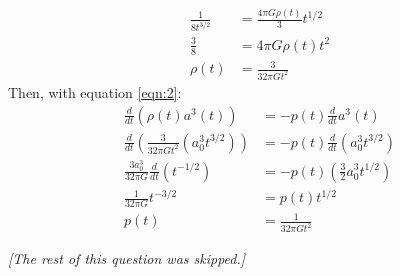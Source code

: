 \documentclass[11pt]{article}
\begin{document}
\begin{enumerate}[label=\textbf{\arabic*.}, start=2]
{\begin{enumerate}[label=\textbf{(\alph*)}]
{\begin{align*}
                        \frac{1}{8t^{3/2}}&=\frac{4\pi G\rho(t)}{3}t^{1/2} \\
                        \frac{3}{8}&=4\pi G\rho(t)t^2 \\
                        \rho(t)&=\frac{3}{32\pi Gt^2}
                    \end{align*}
                    Then, with equation \ref{eqn:2}:
                    \begin{align*}
                        \frac{d}{dt}(\rho(t)a^3(t))&=-p(t)\frac{d}{dt}a^3(t) \\
                        \frac{d}{dt}\left(\frac{3}{32\pi Gt^2}(a_0^3t^{3/2})\right)&=-p(t)\frac{d}{dt}(a_0^3t^{3/2}) \\
                        \frac{3a_0^3}{32\pi G}\frac{d}{dt}\left(t^{-1/2}\right)&=-p(t)\left(\frac{3}{2}a_0^3t^{1/2}\right) \\
                        \frac{1}{32\pi G}t^{-3/2}&=p(t)t^{1/2} \\
                        p(t)&=\frac{1}{32\pi Gt^2}
                    \end{align*}
                }
            \end{enumerate}
            \textit{[The rest of this question was skipped.]}
        }
    \end{enumerate}
\end{document}
